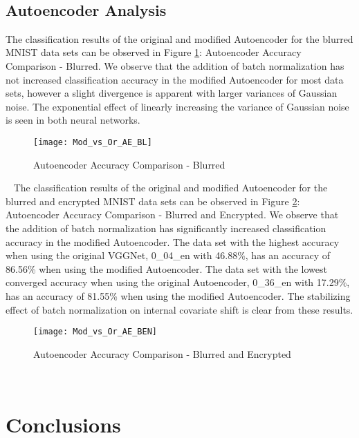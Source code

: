\documentclass[12pt, titlepage]{article}
\begin{document}
~\newpage
\subsection{Autoencoder Analysis}\label{AEAnalysis}

The classification results of the original and modified Autoencoder for the blurred MNIST data sets can be observed in Figure \ref{GRAPH_COMP_AE_BL}: Autoencoder Accuracy Comparison - Blurred. We observe that the addition of batch normalization has not increased classification accuracy in the modified Autoencoder for most data sets, however a slight divergence is apparent with larger variances of Gaussian noise. The exponential effect of linearly increasing the variance of Gaussian noise is seen in both neural networks.\\

\begin{figure}[h!]
	\begin{center}
		\texttt{[image: Mod\_vs\_Or\_AE\_BL]}
		\caption{Autoencoder Accuracy Comparison - Blurred}
		\label{GRAPH_COMP_AE_BL}
	\end{center}
\end{figure}

~\newpage
\noindent The classification results of the original and modified Autoencoder for the blurred and encrypted MNIST data sets can be observed in Figure \ref{GRAPH_COMP_AE_BEN}: Autoencoder Accuracy Comparison - Blurred and Encrypted. We observe that the addition of batch normalization has significantly increased classification accuracy in the modified Autoencoder. The data set with the highest accuracy when using the original VGGNet, 0\_04\_en with 46.88\%, has an accuracy of 86.56\% when using the modified Autoencoder. The data set with the lowest converged accuracy when using the original Autoencoder, 0\_36\_en with 17.29\%, has an accuracy of 81.55\% when using the modified Autoencoder. The stabilizing effect of batch normalization on internal covariate shift is clear from these results.\\

\begin{figure}[h!]
	\begin{center}
		\texttt{[image: Mod\_vs\_Or\_AE\_BEN]}
		\caption{Autoencoder Accuracy Comparison - Blurred and Encrypted}
		\label{GRAPH_COMP_AE_BEN}
	\end{center}
\end{figure}

~\newpage
\section{Conclusions}
\end{document}
